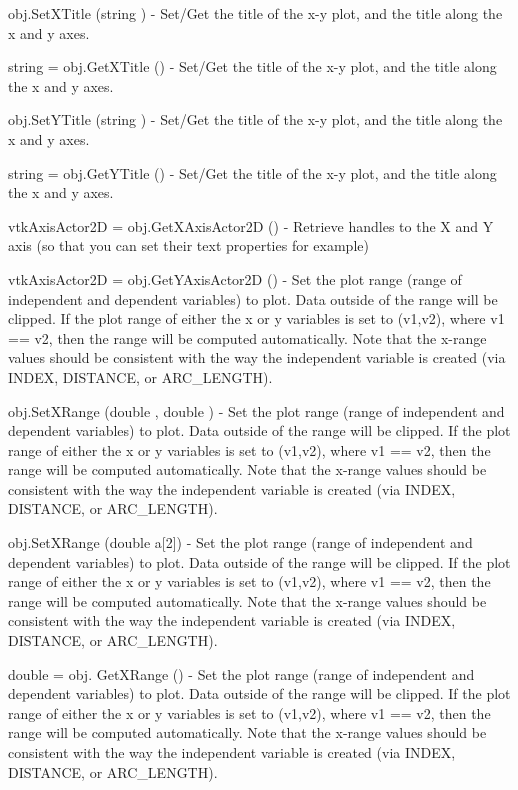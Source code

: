\begin{DoxyItemize}
\item {\ttfamily obj.\-Set\-X\-Title (string )} -\/ Set/\-Get the title of the x-\/y plot, and the title along the x and y axes.  
\item {\ttfamily string = obj.\-Get\-X\-Title ()} -\/ Set/\-Get the title of the x-\/y plot, and the title along the x and y axes.  
\item {\ttfamily obj.\-Set\-Y\-Title (string )} -\/ Set/\-Get the title of the x-\/y plot, and the title along the x and y axes.  
\item {\ttfamily string = obj.\-Get\-Y\-Title ()} -\/ Set/\-Get the title of the x-\/y plot, and the title along the x and y axes.  
\item {\ttfamily vtk\-Axis\-Actor2\-D = obj.\-Get\-X\-Axis\-Actor2\-D ()} -\/ Retrieve handles to the X and Y axis (so that you can set their text properties for example)  
\item {\ttfamily vtk\-Axis\-Actor2\-D = obj.\-Get\-Y\-Axis\-Actor2\-D ()} -\/ Set the plot range (range of independent and dependent variables) to plot. Data outside of the range will be clipped. If the plot range of either the x or y variables is set to (v1,v2), where v1 == v2, then the range will be computed automatically. Note that the x-\/range values should be consistent with the way the independent variable is created (via I\-N\-D\-E\-X, D\-I\-S\-T\-A\-N\-C\-E, or A\-R\-C\-\_\-\-L\-E\-N\-G\-T\-H).  
\item {\ttfamily obj.\-Set\-X\-Range (double , double )} -\/ Set the plot range (range of independent and dependent variables) to plot. Data outside of the range will be clipped. If the plot range of either the x or y variables is set to (v1,v2), where v1 == v2, then the range will be computed automatically. Note that the x-\/range values should be consistent with the way the independent variable is created (via I\-N\-D\-E\-X, D\-I\-S\-T\-A\-N\-C\-E, or A\-R\-C\-\_\-\-L\-E\-N\-G\-T\-H).  
\item {\ttfamily obj.\-Set\-X\-Range (double a\mbox{[}2\mbox{]})} -\/ Set the plot range (range of independent and dependent variables) to plot. Data outside of the range will be clipped. If the plot range of either the x or y variables is set to (v1,v2), where v1 == v2, then the range will be computed automatically. Note that the x-\/range values should be consistent with the way the independent variable is created (via I\-N\-D\-E\-X, D\-I\-S\-T\-A\-N\-C\-E, or A\-R\-C\-\_\-\-L\-E\-N\-G\-T\-H).  
\item {\ttfamily double = obj. Get\-X\-Range ()} -\/ Set the plot range (range of independent and dependent variables) to plot. Data outside of the range will be clipped. If the plot range of either the x or y variables is set to (v1,v2), where v1 == v2, then the range will be computed automatically. Note that the x-\/range values should be consistent with the way the independent variable is created (via I\-N\-D\-E\-X, D\-I\-S\-T\-A\-N\-C\-E, or A\-R\-C\-\_\-\-L\-E\-N\-G\-T\-H).  

\end{DoxyItemize}
